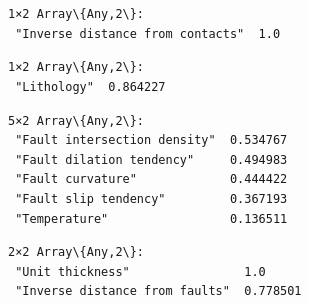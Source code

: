\documentclass[11pt]{article}
\begin{document}
    \begin{center}
    \end{center}
    { \hspace*{\fill} \\}

    \begin{Verbatim}[commandchars=\\\{\}]

    \end{Verbatim}

    \begin{center}
    \end{center}
    { \hspace*{\fill} \\}

    \begin{Verbatim}[commandchars=\\\{\}]

    \end{Verbatim}


    \begin{Verbatim}[commandchars=\\\{\}]
1×2 Array\{Any,2\}:
 "Inverse distance from contacts"  1.0
    \end{Verbatim}



    \begin{Verbatim}[commandchars=\\\{\}]
1×2 Array\{Any,2\}:
 "Lithology"  0.864227
    \end{Verbatim}



    \begin{Verbatim}[commandchars=\\\{\}]
5×2 Array\{Any,2\}:
 "Fault intersection density"  0.534767
 "Fault dilation tendency"     0.494983
 "Fault curvature"             0.444422
 "Fault slip tendency"         0.367193
 "Temperature"                 0.136511
    \end{Verbatim}



    \begin{Verbatim}[commandchars=\\\{\}]
2×2 Array\{Any,2\}:
 "Unit thickness"                1.0
 "Inverse distance from faults"  0.778501
    \end{Verbatim}
\end{document}
